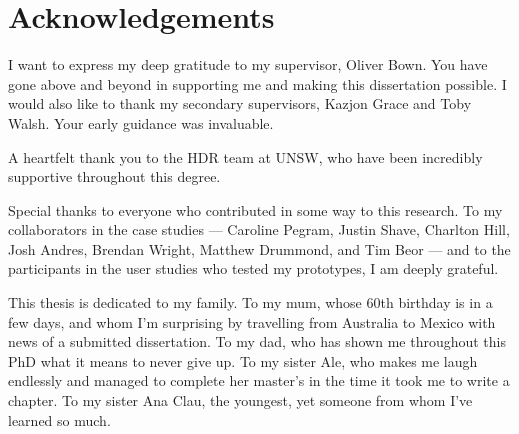 \chapter{Acknowledgements}

I want to express my deep gratitude to my supervisor, Oliver Bown. You have gone above and beyond in supporting me and making this dissertation possible. I would also like to thank my secondary supervisors, Kazjon Grace and Toby Walsh. Your early guidance was invaluable.

A heartfelt thank you to the HDR team at UNSW, who have been incredibly supportive throughout this degree.

Special thanks to everyone who contributed in some way to this research. To my collaborators in the case studies — Caroline Pegram, Justin Shave, Charlton Hill, Josh Andres, Brendan Wright, Matthew Drummond, and Tim Beor — and to the participants in the user studies who tested my prototypes, I am deeply grateful.

This thesis is dedicated to my family. To my mum, whose 60th birthday is in a few days, and whom I’m surprising by travelling from Australia to Mexico with news of a submitted dissertation. To my dad, who has shown me throughout this PhD what it means to never give up. To my sister Ale, who makes me laugh endlessly and managed to complete her master’s in the time it took me to write a chapter. To my sister Ana Clau, the youngest, yet someone from whom I’ve learned so much. 